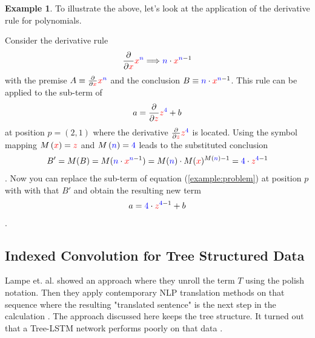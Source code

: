 \documentclass{scrartcl}
\theoremstyle{definition}
\newtheorem{exmp}{Example}[section]
\begin{document}
\begin{exmp}
To illustrate the above, let's look at the application of the derivative rule for polynomials.

Consider the derivative rule
\begin{align}
	\frac{\partial}{\partial {\color{red}x}} {\color{red}x}^{\color{blue}n} \Longrightarrow {\color{blue}n}\cdot {\color{red}x}^{{\color{blue}n}-1} 
\end{align}
with the premise $A\equiv \frac{\partial}{\partial {\color{red}x}} {\color{red}x}^{\color{blue}n}$ and the conclusion $B\equiv {\color{blue}n}\cdot {\color{red}x}^{{\color{blue}n}-1}$.
This rule can be applied to the sub-term of
\begin{align}
	a = \frac{\partial}{\partial {\color{red}z}} {\color{red}z}^{\color{blue}4} + b
	\label{example:problem}
\end{align}
at position $p=\left(2,1\right)$ where the derivative $\frac{\partial}{\partial {\color{red}z}} {\color{red}z}^{\color{blue}4}$ is located.
Using the symbol mapping $M\left({\color{red}x}\right) = \color{red}z$ and $M\left({\color{blue}n} \right) = {\color{blue}4}$ leads to the substituted conclusion
\begin{align}
B' = M(B) = M({\color{blue}n}\cdot {\color{red}x}^{{\color{blue}n}-1}) = {M(\color{blue}n})\cdot M({\color{red}x})^{M({\color{blue}n})-1} = {\color{blue}4}\cdot {\color{red}z}^{{\color{blue}4}-1}
\end{align}.
Now you can replace the sub-term of equation (\ref{example:problem}) at position $p$ with with that $B'$ and obtain the resulting new term
\begin{align}
	a = {\color{blue}4}\cdot {\color{red}z}^{{\color{blue}4}-1} + b
\end{align}.

\end{exmp}

\subsection{Indexed Convolution for Tree Structured Data}

Lampe et. al. showed an approach where they unroll the term $T$ using the polish notation.
Then they apply contemporary NLP translation methods on that sequence where the resulting "translated sentence" is the next step in the calculation \cite{Lample2020Deep}.
The approach discussed here keeps the tree structure.
It turned out that a Tree-LSTM network performs poorly on that data \cite{tai2015improved}.
\end{document}
